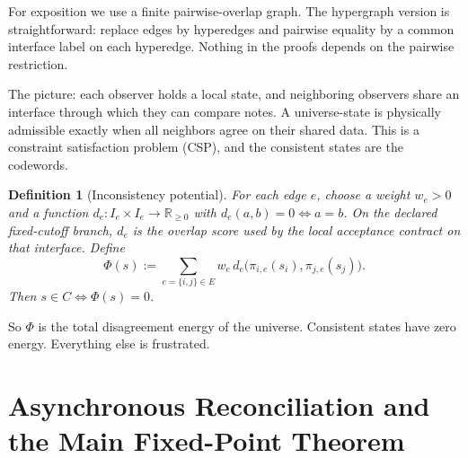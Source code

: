 \documentclass[11pt]{article}
\newtheorem{definition}[theorem]{Definition}
\theoremstyle{remark}
\theoremstyle{plain}
\begin{document}
For exposition we use a finite pairwise-overlap graph. The hypergraph version is straightforward: replace edges by hyperedges and pairwise equality by a common interface label on each hyperedge. Nothing in the proofs depends on the pairwise restriction.

The picture: each observer holds a local state, and neighboring observers share an interface through which they can compare notes. A universe-state is physically admissible exactly when all neighbors agree on their shared data. This is a constraint satisfaction problem (CSP), and the consistent states are the codewords.

\begin{definition}[Inconsistency potential]\label{def:potential}
For each edge $e$, choose a weight $w_e>0$ and a function $d_e:I_e\times I_e\to\mathbb{R}_{\ge 0}$ with $d_e(a,b)=0 \iff a=b$. On the declared fixed-cutoff branch, \(d_e\) is the overlap score used by the local acceptance contract on that interface. Define
\[
\Phi(s)
:=
\sum_{e=\{i,j\}\in E}
w_e\, d_e\!\bigl(\pi_{i,e}(s_i),\pi_{j,e}(s_j)\bigr).
\]
Then $s\in C \iff \Phi(s)=0$.
\end{definition}

So $\Phi$ is the total disagreement energy of the universe. Consistent states have zero energy. Everything else is frustrated.


\section{Asynchronous Reconciliation and the Main Fixed-Point Theorem}
\end{document}
